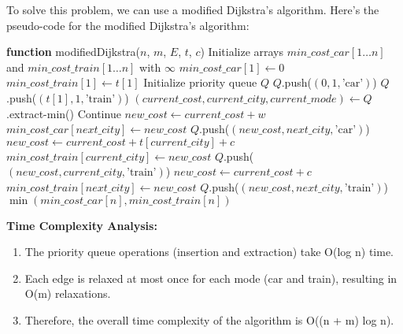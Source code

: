 \begin{solution}

    To solve this problem, we can use a modified Dijkstra's algorithm. Here's the pseudo-code for the modified Dijkstra's algorithm:


    \begin{algorithmic}[1]
        \State \textbf{function} modifiedDijkstra($n$, $m$, $E$, $t$, $c$)
        \State Initialize arrays $min\_cost\_car[1 \ldots n]$ and $min\_cost\_train[1 \ldots n]$ with $\infty$
        \State $min\_cost\_car[1] \leftarrow 0$
        \State $min\_cost\_train[1] \leftarrow t[1]$
        \State Initialize priority queue $Q$
        \State $Q$.push($(0, 1, \text{'car'})$)
        \State $Q$.push($(t[1], 1, \text{'train'})$)
        \State $(current\_cost, current\_city, current\_mode) \leftarrow Q$.extract-min()
        \State Continue
        \EndIf
        \State $new\_cost \leftarrow current\_cost + w$
        \State $min\_cost\_car[next\_city] \leftarrow new\_cost$
        \State $Q$.push($(new\_cost, next\_city, \text{'car'})$)
        \EndIf
        \EndFor
        \State $new\_cost \leftarrow current\_cost + t[current\_city] + c$
        \State $min\_cost\_train[current\_city] \leftarrow new\_cost$
        \State $Q$.push($(new\_cost, current\_city, \text{'train'})$)
        \EndIf
        \State $new\_cost \leftarrow current\_cost + c$
        \State $min\_cost\_train[next\_city] \leftarrow new\_cost$
        \State $Q$.push($(new\_cost, next\_city, \text{'train'})$)
        \EndIf
        \EndFor
        \EndIf
        \EndWhile
        \State \Return $\min(min\_cost\_car[n], min\_cost\_train[n])$
    \end{algorithmic}

    \textbf{Time Complexity Analysis:}

    \begin{enumerate}
        \item The priority queue operations (insertion and extraction) take O(log n) time.
        \item Each edge is relaxed at most once for each mode (car and train), resulting in O(m) relaxations.
        \item Therefore, the overall time complexity of the algorithm is O((n + m) log n).
    \end{enumerate}
\end{solution}




